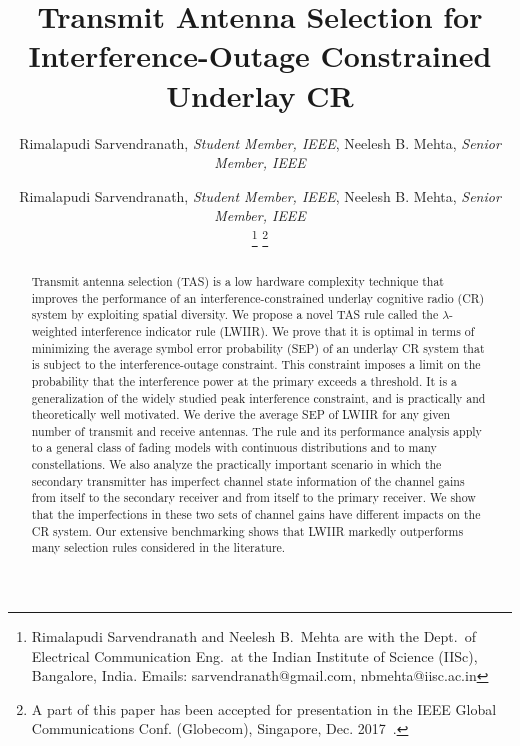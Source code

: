\documentclass[12pt,draftcls,peerreview,onecolumn]{IEEEtran}
\begin{document}
\title{Transmit Antenna Selection for Interference-Outage Constrained Underlay CR}

\author{Rimalapudi Sarvendranath, {\it Student Member, IEEE}, Neelesh B. Mehta, {\it Senior Member, IEEE}}

\author{
	Rimalapudi Sarvendranath, {\it Student Member, IEEE}, Neelesh B. Mehta, {\it Senior Member, IEEE}
	
	\thanks{Rimalapudi Sarvendranath and Neelesh B.\ Mehta are with the
		Dept.\ of Electrical Communication Eng.\ at the Indian Institute of
		Science (IISc), Bangalore, India. Emails:
		sarvendranath@gmail.com, nbmehta@iisc.ac.in}
		\thanks{A part of this paper has been accepted for presentation in the IEEE Global
		Communications Conf. (Globecom), Singapore, Dec. 2017~\cite{sarvnedranath_2017_globecom}.}
}

\setcounter{page}{1}

\maketitle

\begin{abstract}
Transmit antenna selection (TAS) is a low hardware complexity technique that improves the performance of an interference-constrained underlay cognitive radio (CR) system by exploiting spatial diversity. We propose a novel TAS rule called the $\lambda$-weighted interference indicator rule (LWIIR). We prove that it is optimal in terms of minimizing the average symbol error probability (SEP) of an underlay CR system that is subject to the interference-outage constraint. This constraint imposes a limit on the probability that the interference power at the primary exceeds a threshold. It is a generalization of the widely studied peak interference constraint, and is practically and theoretically well motivated. We derive the average SEP of LWIIR for any given number of transmit and receive antennas. The rule and its performance analysis apply to a general class of fading models with continuous distributions and to many constellations. We also analyze the practically important scenario in which the secondary transmitter has imperfect channel state information of the channel gains from itself to the secondary receiver and from itself to the primary receiver. We show that the imperfections in these two sets of channel gains have different impacts on the CR system. Our extensive benchmarking shows that LWIIR markedly outperforms many selection rules considered in the literature.

\end{abstract}
\end{document}
